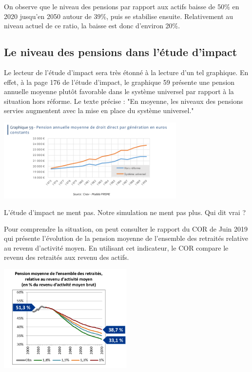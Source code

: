 \documentclass[10pt]{article}
\begin{document}
On observe que le niveau des pensions par rapport aux actifs 
baisse de 50\% en 2020 jusqu'en 2050 autour de 39\%, puis se stabilise ensuite. 
Relativement au niveau actuel de ce ratio, la baisse est donc d'environ 20\%. 


\subsection{Le niveau des pensions dans l'étude d'impact}

Le lecteur de l'étude d'impact sera très étonné à la lecture d'un 
tel graphique. 
En effet, à la page 176 de l'étude d'impact, le graphique 59 présente 
une pension annuelle moyenne plutôt favorable dans le système 
universel par rapport à la situation hors réforme. 
Le texte précise : "En moyenne, les niveaux des pensions servies augmentent 
avec la mise en place du système universel."

\begin{center}
\includegraphics[width=0.7\textwidth]{EtudeImpact-PensionAnnuelle.png}
\end{center}

L'étude d'impact ne ment pas. 
Notre simulation ne ment pas plus. 
Qui dit vrai ?

Pour comprendre la situation, on peut consulter le rapport du COR de Juin 2019 qui 
présente l'évolution de la pension moyenne de l'ensemble des retraités relative 
au revenu d'activité moyen. 
En utilisant cet indicateur, le COR compare le revenu des retraités aux revenu des 
actifs. 

\begin{center}
\includegraphics[width=0.5\textwidth]{COR-Juin-2019-P.png}
\end{center}
\end{document}
